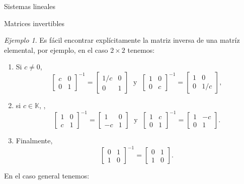 \documentclass[a4paper,12pt,twoside,spanish,reqno]{amsbook}
\numberwithin{equation}{section}
\theoremstyle{definition}
\theoremstyle{remark}
\newtheorem*{ejemplo*}{Ejemplo}
\newcommand{\K}{\mathbb K}
\begin{document}
\begin{chapter}{Sistemas lineales}
\begin{section}{Matrices invertibles}
            
            \begin{ejemplo*}
                Es fácil encontrar explícitamente la matriz inversa de una matríz elemental, por ejemplo, en el caso $2 \times 2$ tenemos:
                \begin{enumerate}
                    \item Si $c \not=0$,
                    \begin{equation*}
                    \begin{bmatrix} c& 0\\ 0&1\end{bmatrix}^{-1}=\begin{bmatrix} 1/c& 0\\ 0&1\end{bmatrix}
                    \;\text{ y }\; \begin{bmatrix} 1& 0\\ 0&c\end{bmatrix}^{-1}=\begin{bmatrix} 1& 0\\ 0&1/c\end{bmatrix},
                    \end{equation*}
                    \item si  $c \in \K$, ,
                    \begin{equation*}
                    \begin{bmatrix} 1& 0\\ c&1\end{bmatrix}^{-1}=\begin{bmatrix} 1& 0\\ -c&1\end{bmatrix}
                    \;\text{ y }\; \begin{bmatrix} 1& c\\ 0&1\end{bmatrix}^{-1}=\begin{bmatrix} 1& -c\\ 0&1\end{bmatrix}.
                    \end{equation*}
                    \item Finalmente, 
                    \begin{equation*}
                    \begin{bmatrix} 0& 1\\ 1&0\end{bmatrix} ^{-1}= 	\begin{bmatrix} 0& 1\\ 1&0\end{bmatrix}.
                    \end{equation*}
                \end{enumerate}
            En  el caso general tenemos:
            

\end{ejemplo*}
\end{section}
\end{chapter}
\end{document}
